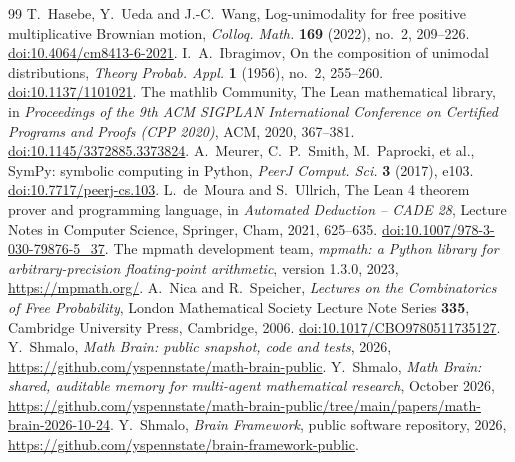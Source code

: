 \documentclass[11pt]{amsart}
\theoremstyle{definition}
\begin{document}
\begin{thebibliography}{99}
 T.~Hasebe, Y.~Ueda and J.-C.~Wang, Log-unimodality for free positive multiplicative Brownian motion,
\emph{Colloq. Math.} \textbf{169} (2022), no.~2, 209--226.
\href{https://doi.org/10.4064/cm8413-6-2021}{doi:10.4064/cm8413-6-2021}.
 I.~A.~Ibragimov, On the composition of unimodal distributions, \emph{Theory Probab. Appl.} \textbf{1}
(1956), no.~2, 255--260. \href{https://doi.org/10.1137/1101021}{doi:10.1137/1101021}.
 The mathlib Community, The Lean mathematical library, in \emph{Proceedings of the 9th ACM SIGPLAN
International Conference on Certified Programs and Proofs (CPP 2020)}, ACM, 2020, 367--381.
\href{https://doi.org/10.1145/3372885.3373824}{doi:10.1145/3372885.3373824}.
 A.~Meurer, C.~P.~Smith, M.~Paprocki, et al., SymPy: symbolic computing in Python, \emph{PeerJ Comput.
Sci.} \textbf{3} (2017), e103. \href{https://doi.org/10.7717/peerj-cs.103}{doi:10.7717/peerj-cs.103}.
 L.~de~Moura and S.~Ullrich, The Lean 4 theorem prover and programming language, in \emph{Automated
Deduction -- CADE 28}, Lecture Notes in Computer Science, Springer, Cham, 2021, 625--635.
\href{https://doi.org/10.1007/978-3-030-79876-5_37}{doi:10.1007/978-3-030-79876-5\_37}.
 The mpmath development team, \emph{mpmath: a Python library for arbitrary-precision floating-point
arithmetic}, version 1.3.0, 2023, \url{https://mpmath.org/}.
 A.~Nica and R.~Speicher, \emph{Lectures on the Combinatorics of Free Probability}, London Mathematical
Society Lecture Note Series \textbf{335}, Cambridge University Press, Cambridge, 2006.
\href{https://doi.org/10.1017/CBO9780511735127}{doi:10.1017/CBO9780511735127}.
 Y.~Shmalo, \emph{Math Brain: public snapshot, code and tests}, 2026,
\url{https://github.com/yspennstate/math-brain-public}.
 Y.~Shmalo, \emph{Math Brain: shared, auditable memory for multi-agent mathematical research},
October 2026, \url{https://github.com/yspennstate/math-brain-public/tree/main/papers/math-brain-2026-10-24}.
 Y.~Shmalo, \emph{Brain Framework}, public software repository, 2026,
\url{https://github.com/yspennstate/brain-framework-public}.
\end{thebibliography}
\end{document}
